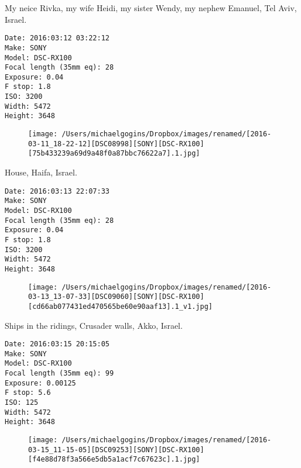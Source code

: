 \documentclass[11pt,letter,DIV=14,paper=landscape]{scrbook}
\begin{document}
\clearpage
\noindent My neice Rivka, my wife Heidi, my sister Wendy, my nephew Emanuel, Tel Aviv, Israel.
\noindent
\begin{lstlisting}
Date: 2016:03:12 03:22:12
Make: SONY
Model: DSC-RX100
Focal length (35mm eq): 28
Exposure: 0.04
F stop: 1.8
ISO: 3200
Width: 5472
Height: 3648
\end{lstlisting}
\clearpage

\begin{figure}
\texttt{[image: /Users/michaelgogins/Dropbox/images/renamed/[2016-03-11\_18-22-12][DSC08998][SONY][DSC-RX100][75b433239a69d9a48f0a87bbc76622a7].1.jpg]}
\end{figure}
    
\clearpage
\noindent House, Haifa, Israel.
\noindent
\begin{lstlisting}
Date: 2016:03:13 22:07:33
Make: SONY
Model: DSC-RX100
Focal length (35mm eq): 28
Exposure: 0.04
F stop: 1.8
ISO: 3200
Width: 5472
Height: 3648
\end{lstlisting}
\clearpage

\begin{figure}
\texttt{[image: /Users/michaelgogins/Dropbox/images/renamed/[2016-03-13\_13-07-33][DSC09060][SONY][DSC-RX100][cd66ab077431ed470565be60e90aaf13].1\_v1.jpg]}
\end{figure}
    
\clearpage
\noindent Ships in the ridings, Crusader walls, Akko, Israel.
\noindent
\begin{lstlisting}
Date: 2016:03:15 20:15:05
Make: SONY
Model: DSC-RX100
Focal length (35mm eq): 99
Exposure: 0.00125
F stop: 5.6
ISO: 125
Width: 5472
Height: 3648
\end{lstlisting}
\clearpage

\begin{figure}
\texttt{[image: /Users/michaelgogins/Dropbox/images/renamed/[2016-03-15\_11-15-05][DSC09253][SONY][DSC-RX100][f4e88d78f3a566e5db5a1acf7c67623c].1.jpg]}
\end{figure}
    
\end{document}
